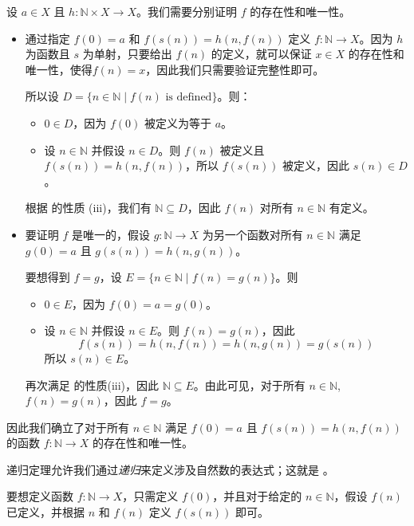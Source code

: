 \begin{cproof}
设 $a \in X$ 且 $h : \mathbb{N} \times X \to X$。我们需要分别证明 $f$ 的存在性和唯一性。

\begin{itemize}
\item 通过指定 $f(0) = a$ 和 $f(s(n)) = h(n, f(n))$ 定义 $f : \mathbb{N} \to X$。因为 $h$ 为函数且 $s$ 为单射，只要给出 $f(n)$ 的定义，就可以保证 $x \in X$ 的存在性和唯一性，使得$f(n) = x$，因此我们只需要验证完整性即可。

所以设 $D = \{ n \in \mathbb{N} \mid f(n) \text{ is defined} \}$。则：

\begin{itemize}
\item $0 \in D$，因为 $f(0)$ 被定义为等于 $a$。
\item 设 $n \in \mathbb{N}$ 并假设 $n \in D$。则 $f(n)$ 被定义且 $f(s(n)) = h(n, f(n))$，所以 $f(s(n))$ 被定义，因此 $s(n) \in D$。
\end{itemize}

根据  的性质 (iii)，我们有 $\mathbb{N} \subseteq D$，因此 $f(n)$ 对所有 $n \in \mathbb{N}$ 有定义。

\item 要证明 $f$ 是唯一的，假设 $g : \mathbb{N} \to X$ 为另一个函数对所有 $n \in \mathbb{N}$ 满足 $g(0) = a$ 且 $g(s(n)) = h(n, g(n))$。

要想得到 $f = g$，设 $E = \{ n \in \mathbb{N} \mid f(n) = g(n) \}$。则
\begin{itemize}
\item $0 \in E$，因为 $f(0) = a = g(0)$。
\item 设 $n \in \mathbb{N}$ 并假设 $n \in E$。则 $f(n) = g(n)$，因此
\[ f(s(n)) = h(n,f(n)) = h(n,g(n)) = g(s(n)) \]
所以 $s(n) \in E$。
\end{itemize}
再次满足  的性质(iii)，因此 $\mathbb{N}\subseteq E$。由此可见，对于所有 $n \in \mathbb{N}$, $f(n) = g(n)$，因此 $f=g$。
\end{itemize}

因此我们确立了对于所有 $n \in \mathbb{N}$ 满足 $f(0) = a$ 且 $f(s(n)) = h(n, f(n))$ 的函数 $f : \mathbb{N} \to X$ 的存在性和唯一性。
\end{cproof}

递归定理允许我们通过\textit{递归}来定义涉及自然数的表达式；这就是 。

\begin{strategy}[通过递归定义]
\label{strDefinitionByRecursion}
要想定义函数 $f : \mathbb{N} \to X$，只需定义 $f(0)$，并且对于给定的 $n \in \mathbb{N}$，假设 $f(n)$ 已定义，并根据 $n$ 和 $f(n)$ 定义 $f(s(n))$ 即可。
\end{strategy}

